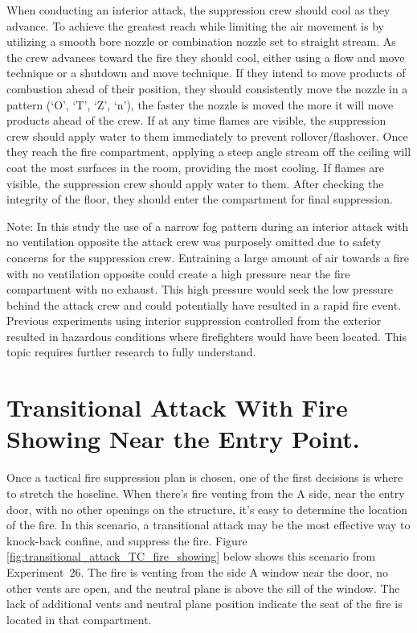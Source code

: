 \documentclass[12pt,oneside]{book}
\begin{document}
When conducting an interior attack, the suppression crew should cool as they advance. To achieve the greatest reach while limiting the air movement is by utilizing a smooth bore nozzle or combination nozzle set to straight stream. As the crew advances toward the fire they should cool, either using a flow and move technique or a shutdown and move technique. If they intend to move products of combustion ahead of their position, they should consistently move the nozzle in a pattern (`O', `T', `Z', `n'), the faster the nozzle is moved the more it will move products ahead of the crew. If at any time flames are visible, the suppression crew should apply water to them immediately to prevent rollover/flashover. Once they reach the fire compartment, applying a steep angle stream off the ceiling will coat the most surfaces in the room, providing the most cooling. If flames are visible, the suppression crew should apply water to them. After checking the integrity of the floor, they should enter the compartment for final suppression.

Note: In this study the use of a narrow fog pattern during an interior attack with no ventilation opposite the attack crew was purposely omitted due to safety concerns for the suppression crew. Entraining a large amount of air towards a fire with no ventilation opposite could create a high pressure near the fire compartment with no exhaust. This high pressure would seek the low pressure behind the attack crew and could potentially have resulted in a rapid fire event. Previous experiments using interior suppression controlled from the exterior resulted in hazardous conditions where firefighters would have been located. This topic requires further research to fully understand.   

\section{Transitional Attack With Fire Showing Near the Entry Point.} \label{tc:transitional_attack_fire_showing}
Once a tactical fire suppression plan is chosen, one of the first decisions is where to stretch the hoseline. When there's fire venting from the A side, near the entry door, with no other openings on the structure, it's easy to determine the location of the fire. In this scenario, a transitional attack may be the most effective way to knock-back confine, and suppress the fire. Figure \ref{fig:transitional_attack_TC_fire_showing} below shows this scenario from Experiment~26. The fire is venting from the side A window near the door, no other vents are open, and the neutral plane is above the sill of the window. The lack of additional vents and neutral plane position indicate the seat of the fire is located in that compartment.
\end{document}
